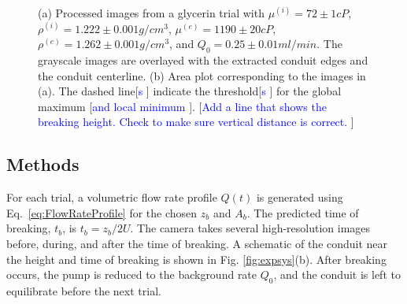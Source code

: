 \documentclass{jfm}
\newcommand{\MM}[1]{[\textcolor{blue}{#1 }]}
\newcommand{\ifl}{^{(i)}}
\newcommand{\efl}{^{(e)}}
\begin{document}
\begin{figure}
\centering
{}
\caption{(a) Processed images from a glycerin trial with $\mu\ifl = 72\pm1 \si{cP}$, $\rho\ifl = 1.222\pm0.001 \si{g/cm^3}$, $\mu\efl = 1190\pm 20 \si{cP}$, $\rho\efl = 1.262\pm0.001\si{g/cm^3}$, and $Q_0 = 0.25\pm 0.01 \si{ml/min}$. The grayscale images are overlayed with the extracted conduit edges and the conduit centerline. (b) Area plot corresponding to the images in (a). The dashed line\MM{s} indicate the threshold\MM{s} for the global maximum \MM{and local minimum}. \MM{Add a line that shows the breaking height. Check to make sure vertical distance is correct.}}
\label{fig:BreakEdge}
\end{figure}

    
	\subsection{Methods}
	For each trial, a volumetric flow rate profile $Q(t)$ is generated using Eq.~\ref{eq:FlowRateProfile} for the chosen $z_b$ and $A_b$. 
	The predicted time of breaking, $t_b$, is $t_b=z_b/2U$.
	The camera takes several high-resolution images before, during, and after the time of breaking.
	A schematic of the conduit near the height and time of breaking is shown in Fig. \ref{fig:expsys}(b).
	After breaking occurs, the pump is reduced to the background rate $Q_0$, and the conduit is left to equilibrate before the next trial.
      
\end{document}
